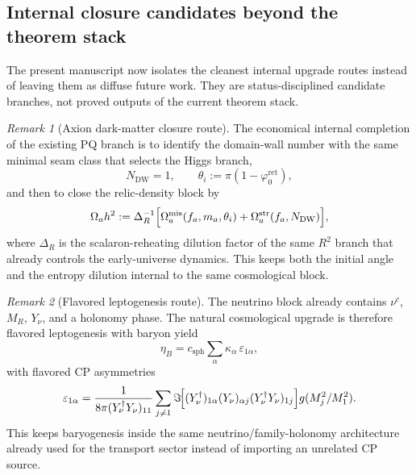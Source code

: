 \documentclass[11pt,a4paper]{article}
\theoremstyle{definition}
\theoremstyle{remark}
\newtheorem*{remark}{Remark}
\newcommand{\phiz}{\varphi_0^{\mathrm{ret}}}
\begin{document}
\subsection{Internal closure candidates beyond the theorem stack}

The present manuscript now isolates the cleanest internal upgrade routes instead of leaving them as diffuse future work. They are status-disciplined candidate branches, not proved outputs of the current theorem stack.

\begin{remark}[Axion dark-matter closure route]
The economical internal completion of the existing PQ branch is to identify the
domain-wall number with the same minimal seam class that selects the Higgs branch,
\[
N_{\mathrm{DW}}=1,
\qquad
\theta_i:=\pi(1-\phiz),
\]
and then to close the relic-density block by
\[
\Omega_a h^2
:=
\Delta_R^{-1}
\Bigl[
\Omega_a^{\mathrm{mis}}(f_a,m_a,\theta_i)
+
\Omega_a^{\mathrm{str}}(f_a,N_{\mathrm{DW}})
\Bigr],
\]
where $\Delta_R$ is the scalaron-reheating dilution factor of the same $R^2$
branch that already controls the early-universe dynamics. This keeps both the
initial angle and the entropy dilution internal to the same cosmological block.
\end{remark}

\begin{remark}[Flavored leptogenesis route]
The neutrino block already contains $\nu^c$, $M_R$, $Y_\nu$, and a holonomy phase.
The natural cosmological upgrade is therefore flavored leptogenesis with baryon yield
\[
\eta_B
=
c_{\mathrm{sph}}
\sum_\alpha
\kappa_\alpha\,\varepsilon_{1\alpha},
\]
with flavored CP asymmetries
\[
\varepsilon_{1\alpha}
=
\frac{1}{8\pi (Y_\nu^\dagger Y_\nu)_{11}}
\sum_{j\neq 1}
\Im\!\Bigl[
(Y_\nu^\dagger)_{1\alpha}(Y_\nu)_{\alpha j}(Y_\nu^\dagger Y_\nu)_{1j}
\Bigr]
g(M_j^2/M_1^2).
\]
This keeps baryogenesis inside the same neutrino/family-holonomy architecture
already used for the transport sector instead of importing an unrelated CP source.
\end{remark}
\end{document}
